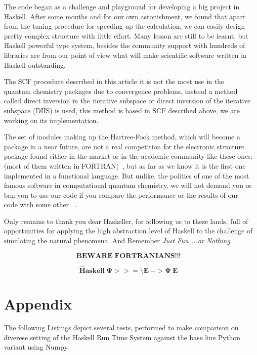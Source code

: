 \documentclass{tmr}
\begin{document}
The code began as a challenge and playground for developing a big project 
in Haskell. After some months and for our own astonishment, we found that
apart from the tuning procedure for speeding up the calculation, we can
easily design pretty complex structure with little effort. Many lesson 
are still to be learnt, but Haskell powerful type system, besides the 
community support with hundreds of libraries are from our point of view what will make 
scientific software written in Haskell outstanding.

The SCF procedure described in this article it is not the most use in
the quantum chemistry packages due to convergence problems, instead a
 method called direct inversion in the iterative subspace or direct
inversion of the iterative subspace (DIIS) is used, this method is 
based in SCF described above, we are working on its implementation.

The set of modules making up the Hartree-Fock method, which will 
become a package in a near future, are not a real competition
for the electronic structure package found either in the market
or in the academic community like these ones: (most of them
written in FORTRAN)~\cite{software},
but as far as we know it is the first one implemented in a 
functional language. But unlike, the politics of one of the 
most famous software in computational quantum chemistry, we
will not demand you or ban you to use our code if you
compare the performance or the results of our code with some
other ~\cite{banned}. 

Only remains to thank you dear Haskeller, for following us to these 
lands, full of opportunities for applying the high abstraction level
of Haskell to the challenge of simulating the natural phenomena. And
Remember \textit{Just Fun ...or Nothing}. 

\[\mathbf{BEWARE\;FORTRANIANS!!!} \]


\[\mathbf{\hat{H}askell\: \Psi >>= \setminus E\: -> \Psi\: E }\]

\section{Appendix}

The following Listings depict several tests, performed to make comparison on diverese setting of the Haskell Run Time System 
against the base line Python variant using Numpy.
\end{document}
